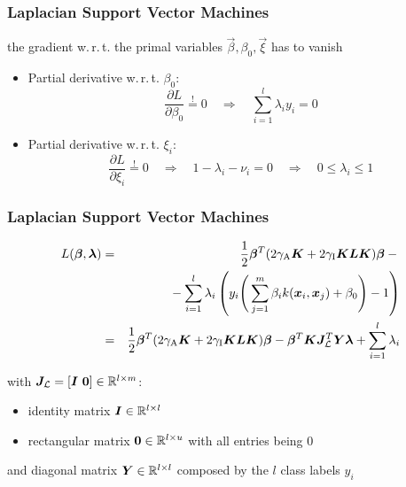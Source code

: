 \begin{frame}
  \frametitle{Laplacian Support Vector Machines \cont}
  
   the gradient w.\,r.\,t. the primal variables $\vec{\beta}, \beta_0, \vec{\xi}$ has to vanish
  \pause
  
  \begin{itemize}
    \item Partial derivative w.\,r.\,t. $\beta_0$:
      \begin{displaymath}
        \frac{\partial L}{\partial \beta_0} \stackrel{!}{=} 0  \quad \Rightarrow \quad
        \sum_{i=1}^l \lambda_i y_i = 0
      \end{displaymath}
      \pause
    \item Partial derivative w.\,r.\,t. $\xi_i$:
      \begin{displaymath}
        \frac{\partial L}{\partial \xi_i} \stackrel{!}{=} 0  \quad \Rightarrow \quad
        1 - \lambda_i - \nu_i = 0 \quad \Rightarrow \quad
        0 \leq \lambda_i \leq 1
      \end{displaymath}
  \end{itemize}
\end{frame}


\begin{frame}
  \frametitle{Laplacian Support Vector Machines \cont}
  
  
  {\small
    \begin{eqnarray*}
      L({\bm \beta}, {\bm \lambda}) 
      &=& \frac{1}{2} {\bm \beta}^T (2 \gamma_\text{A} {\bm K} + 2 \gamma_\text{I} {\bm K}{\bm L}{\bm K}) {\bm \beta} -{} \\
      & & {}- \sum_{i=1}^l \lambda_i \left(y_i \Bigg(\sum_{j=1}^m \beta_i k({\bm x}_i,{\bm x}_j) + \beta_0\Bigg) - 1 \right) \\
      &=& \frac{1}{2} {\bm \beta}^T (2 \gamma_\text{A} {\bm K} + 2 \gamma_\text{I} {\bm K}{\bm L}{\bm K}) {\bm \beta} -
          {\bm \beta}^T {\bm K} {\bm J}_{\mathcal{L}}^T {\bm Y} {\bm \lambda} +
          \sum_{i=1}^l \lambda_i
    \end{eqnarray*}
  }
  
  with ${\bm J}_{\mathcal{L}} = [{\bm I}~{\bm 0}] \in \mathbb{R}^{l\times m}$:
  \begin{itemize}
    \item identity matrix ${\bm I} \in \mathbb{R}^{l \times l}$
    \item rectangular matrix ${\bm 0} \in \mathbb{R}^{l \times u}$ with all entries being 0 \\[.25cm]
  \end{itemize}
  and diagonal matrix ${\bm Y} \in \mathbb{R}^{l \times l}$ composed by the $l$ class labels $y_i$
\end{frame}


